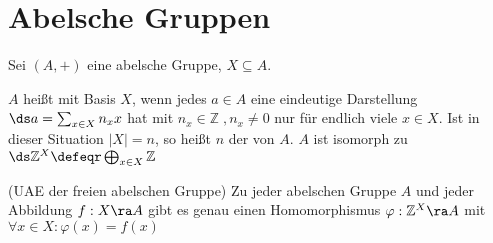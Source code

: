 \section{Abelsche Gruppen}

\begin{DefBem}
\label{1.18}
    Sei $(A,+)$ eine abelsche Gruppe, $X \subseteq A$.
    \begin{enum}
        \item $A$ heißt  mit Basis $X$, wenn jedes $a
        \in A$ eine eindeutige Darstellung $\ds a = \sum_{x\in X} n_x x$ hat mit
        $n_x \in \mathbb{Z}\;, n_x \neq 0$ nur für endlich viele $x \in X$. Ist
        in dieser Situation $|X| = n$, so heißt $n$ der  von $A$. $A$
        ist isomorph zu $\ds \mathbb{Z}^X \defeqr \bigoplus_{x \in X}
        \mathbb{Z}$ \newline

        \item (UAE der freien abelschen Gruppe) \newline
        Zu jeder abelschen Gruppe $A$ und jeder Abbildung $f:X \ra A$ gibt es
        genau einen Homomorphismus $\varphi: \mathbb{Z}^X \ra A$ mit $\forall x
        \in X: \varphi(x) = f(x)$ \newline
    \end{enum}

\end{DefBem} 


